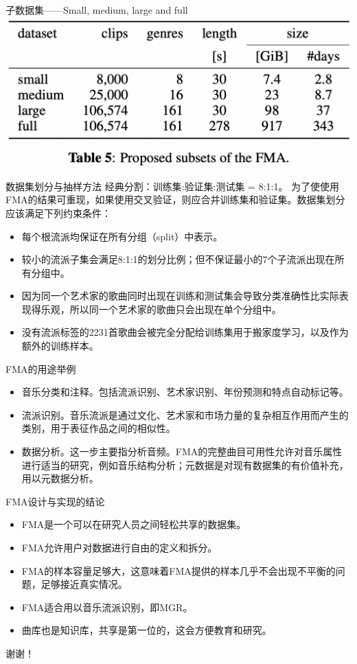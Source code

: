 \documentclass{beamer}
\begin{document}
\begin{frame}{子数据集——Small, medium, large and full}
	\includegraphics[width=\linewidth]{Assets/表5}
\end{frame}

\begin{frame}{数据集划分与抽样方法}
	经典分割：训练集:验证集:测试集 = 8:1:1。
	为了使使用FMA的结果可重现，如果使用交叉验证，则应合并训练集和验证集。数据集划分应该满足下列约束条件：
	\begin{itemize}
		\item 每个根流派均保证在所有分组（split）中表示。
		\item 较小的流派子集会满足8:1:1的划分比例；但不保证最小的7个子流派出现在所有分组中。
		\item 因为同一个艺术家的歌曲同时出现在训练和测试集会导致分类准确性比实际表现得乐观，所以同一个艺术家的歌曲只会出现在单个分组中。
		\item 没有流派标签的2231首歌曲会被完全分配给训练集用于搬家度学习，以及作为额外的训练样本。
	\end{itemize}
\end{frame}

\begin{frame}{FMA的用途举例}
	\begin{itemize}
		\item 音乐分类和注释。包括流派识别、艺术家识别、年份预测和特点自动标记等。
		\item 流派识别。音乐流派是通过文化、艺术家和市场力量的复杂相互作用而产生的类别，用于表征作品之间的相似性。
		\item 数据分析。这一步主要指分析音频。FMA的完整曲目可用性允许对音乐属性进行适当的研究，例如音乐结构分析；元数据是对现有数据集的有价值补充，用以元数据分析。
	\end{itemize}
\end{frame}

\begin{frame}{FMA设计与实现的结论}
	\begin{itemize}
		\item FMA是一个可以在研究人员之间轻松共享的数据集。
		\item FMA允许用户对数据进行自由的定义和拆分。
		\item FMA的样本容量足够大，这意味着FMA提供的样本几乎不会出现不平衡的问题，足够接近真实情况。
		\item FMA适合用以音乐流派识别，即MGR。
		\item 曲库也是知识库，共享是第一位的，这会方便教育和研究。
	\end{itemize}
\end{frame}

\begin{frame}
	谢谢！
\end{frame}
\end{document}
